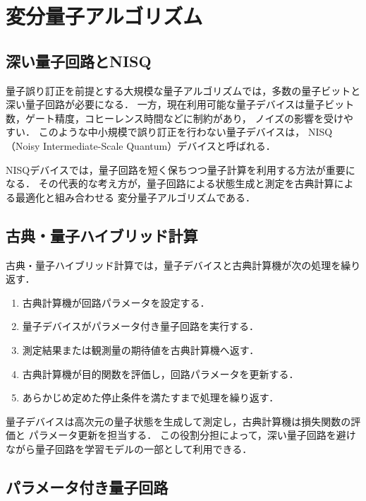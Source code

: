 \section{変分量子アルゴリズム}
\label{sec:variational-quantum-algorithm}

\subsection{深い量子回路とNISQ}
\label{subsec:deep-circuits-and-nisq}

量子誤り訂正を前提とする大規模な量子アルゴリズムでは，多数の量子ビットと深い量子回路が必要になる．
一方，現在利用可能な量子デバイスは量子ビット数，ゲート精度，コヒーレンス時間などに制約があり，
ノイズの影響を受けやすい．
このような中小規模で誤り訂正を行わない量子デバイスは，
NISQ（Noisy Intermediate-Scale Quantum）デバイスと呼ばれる．

NISQデバイスでは，量子回路を短く保ちつつ量子計算を利用する方法が重要になる．
その代表的な考え方が，量子回路による状態生成と測定を古典計算による最適化と組み合わせる
変分量子アルゴリズムである．

\subsection{古典・量子ハイブリッド計算}
\label{subsec:hybrid-computation}

古典・量子ハイブリッド計算では，量子デバイスと古典計算機が次の処理を繰り返す．

\begin{enumerate}[(1)]
  \item 古典計算機が回路パラメータを設定する．
  \item 量子デバイスがパラメータ付き量子回路を実行する．
  \item 測定結果または観測量の期待値を古典計算機へ返す．
  \item 古典計算機が目的関数を評価し，回路パラメータを更新する．
  \item あらかじめ定めた停止条件を満たすまで処理を繰り返す．
\end{enumerate}

量子デバイスは高次元の量子状態を生成して測定し，古典計算機は損失関数の評価と
パラメータ更新を担当する．
この役割分担によって，深い量子回路を避けながら量子回路を学習モデルの一部として利用できる．

\subsection{パラメータ付き量子回路}
\label{subsec:parameterized-quantum-circuit}

